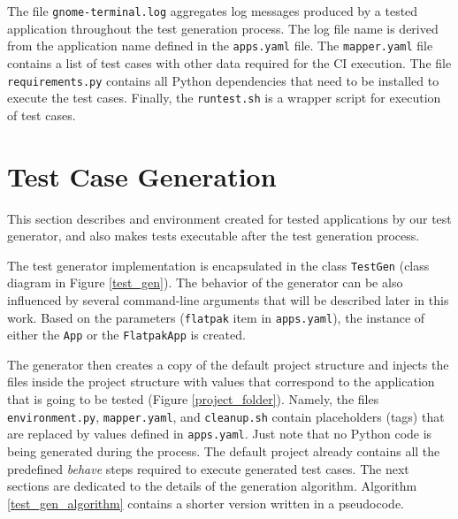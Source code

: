 The file \texttt{gnome-terminal.log} aggregates log messages produced by a tested application throughout the test generation process. The log file name is derived from the application name defined in the \texttt{apps.yaml} file. The \texttt{mapper.yaml} file contains a list of test cases with other data required for the CI execution. The file \texttt{requirements.py} contains all Python dependencies that need to be installed to execute the test cases. Finally, the \texttt{runtest.sh} is a wrapper script for execution of test cases.

\section{Test Case Generation}

This section describes and environment created for tested applications by our test generator, and also makes tests executable after the test generation process.

The test generator implementation is encapsulated in the class \texttt{TestGen} (class diagram in Figure \ref{test_gen}). The behavior of the generator can be also influenced by several command-line arguments that will be described later in this work. Based on the parameters (\texttt{flatpak} item in \texttt{apps.yaml}), the instance of either the \texttt{App} or the \texttt{FlatpakApp} is created. 

The generator then creates a copy of the default project structure and injects the files inside the project structure with values that correspond to the application that is going to be tested (Figure \ref{project_folder}). Namely, the files \texttt{environment.py}, \texttt{mapper.yaml}, and \texttt{cleanup.sh} contain placeholders (tags) that are replaced by values defined in \texttt{apps.yaml}. Just note that no Python code is being generated during the process. The default project already contains all the predefined \textit{behave} steps required to execute generated test cases.
The next sections are dedicated to the details of the generation algorithm. Algorithm \ref{test_gen_algorithm} contains a shorter version written in a pseudocode. 

